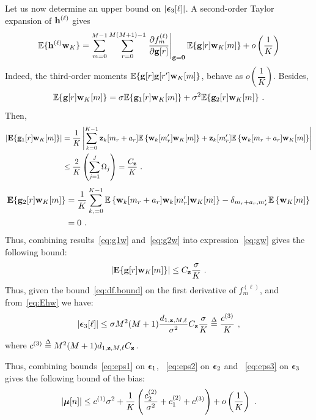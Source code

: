 \documentclass[journal,onecolumn]{IEEEtran}
\begin{document}
Let us now determine an upper bound on $\left|\boldsymbol{\epsilon}_3[\ell]\right|$. 
A second-order Taylor expansion of ${\mathbf h}^{(\ell)}$ gives
\begin{equation}
\EE\{\bh^{(\ell)}\bw_K\}  = \sum_{m=0}^{M-1} \sum_{r=0}^{M(M+1)-1}\left.\dfrac{\partial f_m^{(\ell)}}{\partial \bg[r]}\right\vert_{\bg=\bzero} \EE\{\bg[r]\bw_K[m]\} + o\left(\dfrac1K\right)
\label{eq:Ehw}
\end{equation}
Indeed, the third-order moments ${\mathbb E}\{{\mathbf g}[r]{\mathbf g}[r']{\mathbf w}_K[m]\}$, behave as $o\left(\dfrac1K\right)$. Besides,
\begin{equation}
\EE\{\bg[r]\bw_K[m]\}= \sigma\EE\{\bg_1[r]\bw_K[m]\} + \sigma^2\EE\{\bg_2[r]\bw_K[m]\}\ .
\label{eq:gw}
\end{equation}
Then,
\begin{align}
\nonumber
\left|\bE\{\bg_1[r]\bw_K[m]\}\right| & = \dfrac1{K}\left|\sum_{k=0}^{K-1} \bz_k[m_r+a_r]\EE\left\{\bw_k[m'_r]\bw_{K}[m]\right\} + \bz_k[m'_r]\EE\left\{\bw_k[m_r+a_r]\bw_{K}[m]\right\}\right| \\
& \leq \dfrac2{K}\left(\sum_{j=1}^J \Omega_j\right) = \dfrac{C_\bz}{K}\ .
\label{eq:g1w}
\end{align}
\begin{align}
\nonumber
\bE\{\bg_2[r]\bw_K[m]\} & = \dfrac1{K}\sum_{k,=0}^{K-1} \EE\left\{\bw_{k}[m_{r}+a_{r}]\bw_{k}[m'_{r}]\bw_K[m]\right\} -\delta_{m_r+a_r,m'_r}\EE\left\{\bw_K[m]\right\}\\
& = 0\ .
\label{eq:g2w}
\end{align}
Thus, combining results~\eqref{eq:g1w} and~\eqref{eq:g2w} into expression~\eqref{eq:gw} gives the following bound:
\begin{equation}
\left|\bE\{\bg[r]\bw_K[m]\}\right| \leq C_\bz\dfrac{\sigma}K\ .
\label{eq:gw.bound}
\end{equation}
Thus, given the bound~\eqref{eq:df.bound} on the first derivative of $f_m^{(\ell)}$, and from~\eqref{eq:Ehw} we have:
\begin{equation}
\left|\bepsilon_3[\ell]\right| \leq \sigma M^2(M+1) \dfrac{d_{1,\bz,M,\ell}}{\sigma^2} C_\bz \dfrac{\sigma}{K} \defeq \dfrac{c^{(3)}}{{K}}\ ,
\label{eq:eps3}
\end{equation}
where $ c^{(3)} \overset{\Delta}{=} M^2(M+1)d_{1,{\mathbf z},M,\ell}C_{\mathbf z}$.

Thus, combining bounds~\eqref{eq:eps1} on $\boldsymbol{\epsilon}_1$, ~\eqref{eq:eps2} on $\boldsymbol{\epsilon}_2$ and ~\eqref{eq:eps3} on $\boldsymbol{\epsilon}_3$ gives the following bound of the bias:
\begin{equation}
\left\vert\boldsymbol{\mu}[n]\right\vert \leq  c^{(1)}\sigma^2 + \dfrac1K \left( \dfrac{c_2^{(2)}}{\sigma^2}+c_1^{(2)}+c^{(3)} \right)  + o\left(\dfrac1K\right)\ .
\end{equation}
\end{document}
